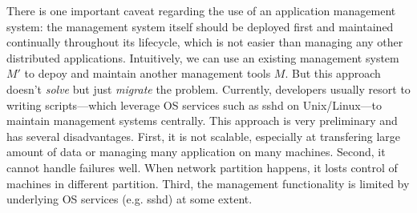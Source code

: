 There is one important caveat regarding the use of an
application management system: the management system itself
should be deployed first and maintained continually
throughout its lifecycle, which is not easier than managing
any other distributed applications. Intuitively, we can use
an existing management system $M'$ to depoy and maintain
another management tools $M$. But this approach doesn't
\emph{solve} but just \emph{migrate} the problem.
Currently, developers usually resort to writing
scripts---which leverage OS services such as sshd on
Unix/Linux---to maintain management systems centrally. This
approach is very preliminary and has several disadvantages.
First, it is not scalable, especially at transfering
large amount of data or managing many application on many
machines. Second, it cannot handle failures well. When
network partition happens, it losts control of machines in
different partition. Third, the management functionality is
limited by underlying OS services (e.g. sshd) at some
extent.

% 
% 
% 
% 
% 
% 
% 
% 
% 
% 
% 


